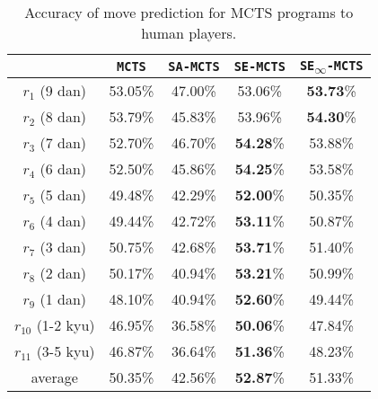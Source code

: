\begin{table}[h]
    \centering
    \caption{Accuracy of move prediction for MCTS programs to human players.}
    \begin{small}
    \begin{tabular}{ccccc}
    \toprule
    & \texttt{MCTS} & \texttt{SA-MCTS} & \texttt{SE-MCTS} & \texttt{SE\textsubscript{$\infty$}-MCTS} \\ 
    \midrule
    $r_1$ (9 dan) & 53.05\%  & 47.00\% & 53.06\% &
\textbf{53.73}\%\\ 
    $r_2$ (8 dan) & 53.79\% & 45.83\% & 53.96\% & \textbf{54.30}\% \\ 
    $r_3$ (7 dan)&  52.70\%	& 46.70\%  & \textbf{54.28}\% & 53.88\% \\ 
    $r_4$ (6 dan)& 52.50\%  & 45.86\% & \textbf{54.25}\% & 53.58\% \\ 
    $r_5$ (5 dan)& 49.48\%  & 42.29\% &  \textbf{52.00}\% & 50.35\% \\
    $r_6$ (4 dan)&  49.44\%	& 42.72\%  &\textbf{53.11}\% & 50.87\% \\ 
    $r_7$ (3 dan)& 50.75\%  & 42.68\% & \textbf{53.71}\% &  51.40\%\\
    $r_8$ (2 dan)&  50.17\%  & 40.94\% & \textbf{53.21}\% & 50.99\% \\ 
    $r_9$ (1 dan)&  48.10\% 	& 40.94\% & \textbf{52.60}\% & 49.44\% \\ 
    $r_{10}$ (1-2 kyu) &  46.95\%	 &	36.58\% & \textbf{50.06}\% & 47.84\% \\ 
    $r_{11}$ (3-5 kyu)& 46.87\%  & 36.64\% & \textbf{51.36}\% & 48.23\% \\ 
    \midrule
    average	& 50.35\% 	&42.56\% & \textbf{52.87}\% & 51.33\%
    \\
    \bottomrule
    \end{tabular}
    \end{small}
    \label{tbl:bs_accuracy}
\end{table}


